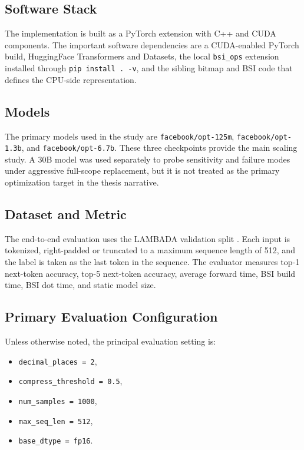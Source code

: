 \subsection{Software Stack}
The implementation is built as a PyTorch extension with C++ and CUDA components. The important software dependencies are a CUDA-enabled PyTorch build, HuggingFace Transformers and Datasets, the local \texttt{bsi\_ops} extension installed through \texttt{pip install . -v}, and the sibling bitmap and BSI code that defines the CPU-side representation.

\subsection{Models}
The primary models used in the study are \texttt{facebook/opt-125m}, \texttt{facebook/opt-1.3b}, and \texttt{facebook/opt-6.7b}. These three checkpoints provide the main scaling study. A 30B model was used separately to probe sensitivity and failure modes under aggressive full-scope replacement, but it is not treated as the primary optimization target in the thesis narrative.

\subsection{Dataset and Metric}
The end-to-end evaluation uses the LAMBADA validation split \cite{lambada}. Each input is tokenized, right-padded or truncated to a maximum sequence length of 512, and the label is taken as the last token in the sequence. The evaluator measures top-1 next-token accuracy, top-5 next-token accuracy, average forward time, BSI build time, BSI dot time, and static model size.

\subsection{Primary Evaluation Configuration}
Unless otherwise noted, the principal evaluation setting is:

\begin{itemize}[leftmargin=2em]
\item \texttt{decimal\_places = 2},
\item \texttt{compress\_threshold = 0.5},
\item \texttt{num\_samples = 1000},
\item \texttt{max\_seq\_len = 512},
\item \texttt{base\_dtype = fp16}.
\end{itemize}

